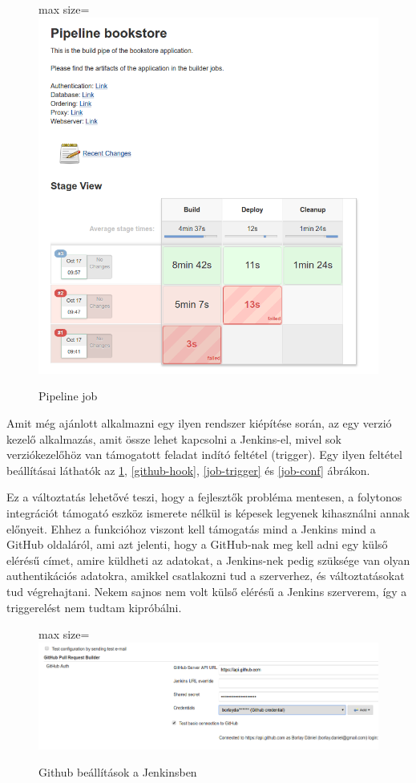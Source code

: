 \documentclass[11pt,magyar,a4paper,twoside,]{report}
\let\Oldincludegraphics\includegraphics
\renewcommand{\includegraphics}[1]{
\begin{adjustbox}{max size={\textwidth}{\textheight}}
    \Oldincludegraphics[scale=0.6]{#1}%
\end{adjustbox}
}
\begin{document}
\begin{figure}[H]
\centering
\includegraphics{img/pipeline-job.png}
\caption{Pipeline job}
\end{figure}

Amit még ajánlott alkalmazni egy ilyen rendszer kiépítése során, az egy
verzió kezelő alkalmazás, amit össze lehet kapcsolni a Jenkins-el, mivel
sok verziókezelőhöz van támogatott feladat indító feltétel (trigger).
Egy ilyen feltétel beállításai láthatók az \ref{jenkins-cred},
\ref{github-hook}, \ref{job-trigger} és \ref{job-conf} ábrákon.

Ez a változtatás lehetővé teszi, hogy a fejlesztők probléma mentesen, a
folytonos integrációt támogató eszköz ismerete nélkül is képesek
legyenek kihasználni annak előnyeit. Ehhez a funkcióhoz viszont kell
támogatás mind a Jenkins mind a GitHub oldaláról, ami azt jelenti, hogy
a GitHub-nak meg kell adni egy külső elérésű címet, amire küldheti az
adatokat, a Jenkins-nek pedig szüksége van olyan authentikációs
adatokra, amikkel csatlakozni tud a szerverhez, és változtatásokat tud
végrehajtani. Nekem sajnos nem volt külső elérésű a Jenkins szerverem,
így a triggerelést nem tudtam kipróbálni.

\begin{figure}[H]
\centering
\includegraphics{img/github-cred.png}
\caption{Github beállítások a Jenkinsben\label{jenkins-cred}}
\end{figure}
\end{document}
